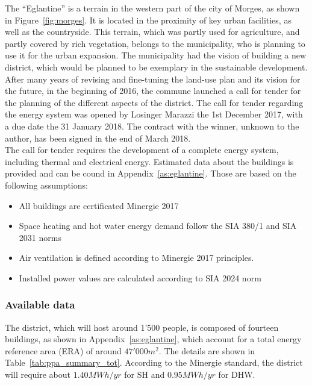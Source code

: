 \documentclass{article}
\begin{document}
The “Eglantine” is a terrain in the western part of the city of Morges, as shown in Figure~\ref{fig:morges}. It is located in the proximity of key urban facilities, as well as the countryside. This terrain, which was partly used for agriculture, and partly covered by rich vegetation, belongs to the municipality, who is planning to use it for the urban expansion. The municipality had the vision of building a new district, which would be planned to be exemplary in the sustainable development. After many years of revising and fine-tuning the land-use plan and its vision for the future, in the beginning of 2016, the commune launched a call for tender for the planning of the different aspects of the district. The call for tender regarding the energy system was opened by Losinger Marazzi the 1st December 2017, with a due date the 31 January 2018. The contract with the winner, unknown to the author, has been signed in the end of March 2018. \\

The call for tender requires the development of a complete energy system, including thermal and electrical energy. Estimated data about the buildings is provided and can be cound in Appendix~\ref{as:eglantine}. Those are based on the following assumptions:
\begin{itemize}
    \item All buildings are certificated Minergie 2017
    \item Space heating and hot water energy demand follow the SIA 380/1 and SIA 2031 norms
    \item Air ventilation is defined according to Minergie 2017 principles.
    \item Installed power values are calculated according to SIA 2024 norm
\end{itemize}

\subsubsection{Available data}
The district, which will host around 1'500 people, is composed of fourteen buildings, as shown in Appendix~\ref{as:eglantine}, which account for a total energy reference area (ERA) of around $47'000 m^{2}$. The details are shown in Table~\ref{tab:ppa_summary_tot}. According to the Minergie standard, the district will require about $1.40 MWh/yr$ for SH and $0.95 MWh/yr$ for DHW.\\


\end{document}

